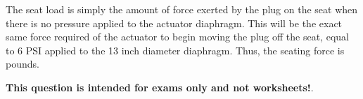 \vskip 10pt

The seat load is simply the amount of force exerted by the plug on the seat when there is no pressure applied to the actuator diaphragm.  This will be the exact same force required of the actuator to begin moving the plug off the seat, equal to 6 PSI applied to the 13 inch diameter diaphragm.  Thus, the seating force is  pounds.







{\bf This question is intended for exams only and not worksheets!}.



